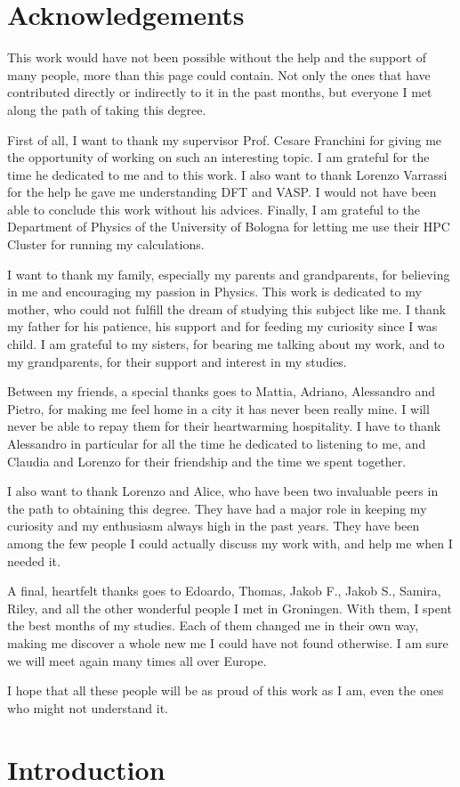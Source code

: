 \chapter*{Acknowledgements}
This work would have not been possible without the help and the support of many people, more than this page could contain. Not only the ones that have contributed directly or indirectly to it in the past months, but everyone I met along the path of taking this degree.

First of all, I want to thank my supervisor Prof. Cesare Franchini for giving me the opportunity of working on such an interesting topic. I am grateful for the time he dedicated to me and to this work. I also want to thank Lorenzo Varrassi for the help he gave me understanding DFT and VASP. I would not have been able to conclude this work without his advices. Finally, I am grateful to the Department of Physics of the University of Bologna for letting me use their HPC Cluster for running my calculations.

I want to thank my family, especially my parents and grandparents, for believing in me and encouraging my passion in Physics. This work is dedicated to my mother, who could not fulfill the dream of studying this subject like me. I thank my father for his patience, his support and for feeding my curiosity since I was child. I am grateful to my sisters, for bearing me talking about my work, and to my grandparents, for their support and interest in my studies.

Between my friends, a special thanks goes to Mattia, Adriano, Alessandro and Pietro, for making me feel home in a city it has never been really mine. I will never be able to repay them for their heartwarming hospitality. I have to thank Alessandro in particular for all the time he dedicated to listening to me, and Claudia and Lorenzo for their friendship and the time we spent together.

I also want to thank Lorenzo and Alice, who have been two invaluable peers in the path to obtaining this degree. They have had a major role in keeping my curiosity and my enthusiasm always high in the past years. They have been among the few people I could actually discuss my work with, and help me when I needed it.

A final, heartfelt thanks goes to Edoardo, Thomas, Jakob F., Jakob S., Samira, Riley, and all the other wonderful people I met in Groningen. With them, I spent the best months of my studies. Each of them changed me in their own way, making me discover a whole new me I could have not found otherwise. I am sure we will meet again many times all over Europe.

I hope that all these people will be as proud of this work as I am, even the ones who might not understand it.

\clearpage
\begingroup
\hypersetup{linkcolor=black}
\tableofcontents
\listoffigures
\endgroup

\chapter{Introduction}
